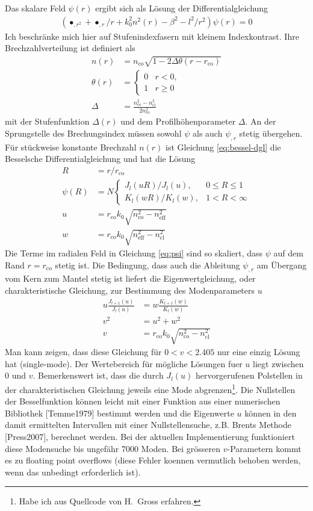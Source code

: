 \documentclass[DIV19,twocolumn]{scrartcl}
\def\({\left(}
\def\){\right)}
\newcommand{\nco}{n_\textrm{co}}
\newcommand{\rco}{r_\textrm{co}}
\newcommand{\neff}{n_\textrm{eff}}
\newcommand{\ncl}{n_\textrm{cl}}
\begin{document}
Das skalare Feld $\psi(r)$ ergibt sich als L\"osung der Differentialgleichung
\begin{align}
\label{eq:bessel-dgl}
\(\bullet_{,r^2} + \bullet_{,r}/r +k_0^2 n^2(r) -\beta^2 -l^2/r^2\)\psi(r) = 0
\end{align}
Ich beschr\"anke mich hier auf Stufenindexfasern mit kleinem
Indexkontrast. Ihre Brechzahlverteilung ist definiert als
\begin{align}
n(r)&=\nco\sqrt{1-2\Delta\theta(r-\rco)} \\
\theta(r)&=\begin{cases}0 &r<0,\\ 1 & r\ge 0\end{cases} \\
\Delta &= \frac{\nco^2-\ncl^2}{2\nco^2}
\end{align}
mit der Stufenfunktion $\Delta(r)$ und dem Profilh\"ohenparameter
$\Delta$. An der Sprungstelle des Brechungsindex m\"ussen sowohl
$\psi$ als auch $\psi_{,r}$ stetig \"ubergehen. F\"ur st\"uckweise konstante Brechzahl $n(r)$ ist Gleichung \eqref{eq:bessel-dgl} die Besselsche Differentialgleichung und hat die L\"osung
\begin{align}
  R&=r/\rco\\
  \psi(R)&=N\begin{cases}
  J_l(uR)/J_l(u), & 0\le R\le 1\\
  K_l(wR)/K_l(w), & 1<R<\infty 
  \end{cases}\label{eq:psi}\\
  u &= \rco k_0 \sqrt{\nco^2-\neff^2} \\
  w &= \rco k_0 \sqrt{\neff^2-\ncl^2} 
\end{align}
Die Terme im radialen Feld in Gleichung \eqref{eq:psi} sind so
skaliert, dass $\psi$ auf dem Rand $r=\rco$ stetig ist. Die Bedingung,
dass auch die Ableitung $\psi_{,r}$ am \"Ubergang vom Kern zum Mantel
stetig ist liefert die Eigenwertgleichung, oder charakteristische
Gleichung, zur Bestimmung des Modenparameters $u$
\begin{align}
  u\frac{J_{l+1}(u)}{J_l(u)}&=w\frac{K_{l+1}(w)}{K_l(w)}\\
  v^2 &= u^2+w^2\\
  v &= \rco k_0 \sqrt{\nco^2-\ncl^2}
\end{align}
Man kann zeigen, dass diese Gleichung f\"ur $0<v<2.405$ nur eine
einzig L\"osung hat (single-mode). Der Wertebereich f\"ur m\"ogliche
L\"osungen fuer $u$ liegt zwischen 0 und $v$. Bemerkenswert ist, dass
die durch $J_l(u)$ hervorgerufenen Polstellen in der
charakteristischen Gleichung jeweils eine Mode abgrenzen\footnote{Habe
  ich aus Quellcode von H.~Gross erfahren.}. Die Nullstellen der
Besselfunktion k\"onnen leicht mit einer Funktion aus einer
numerischen Bibliothek [Temme1979] bestimmt werden und die Eigenwerte
$u$ k\"onnen in den damit ermittelten Intervallen mit einer
Nullstellensuche, z.B. Brents Methode [Press2007], berechnet werden.
Bei der aktuellen Implementierung funktioniert diese Modensuche bis
ungef\"ahr 7000 Moden. Bei gr\"osseren $v$-Parametern kommt es zu
floating point overflows (diese Fehler koennen vermutlich behoben
werden, wenn das unbedingt erforderlich ist).
\end{document}
